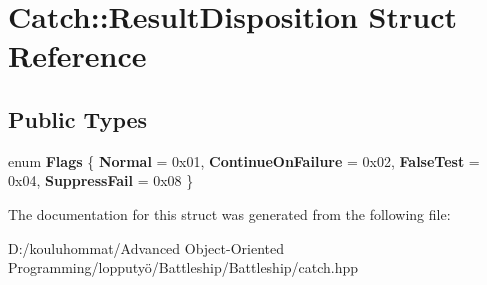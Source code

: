 \hypertarget{struct_catch_1_1_result_disposition}{}\section{Catch\+:\+:Result\+Disposition Struct Reference}
\label{struct_catch_1_1_result_disposition}
\subsection*{Public Types}
\begin{DoxyCompactItemize}
\item 
\mbox{\label{struct_catch_1_1_result_disposition_a3396cad6e2259af326b3aae93e23e9d8}} 
enum {\bfseries Flags} \{ {\bfseries Normal} = 0x01, 
{\bfseries Continue\+On\+Failure} = 0x02, 
{\bfseries False\+Test} = 0x04, 
{\bfseries Suppress\+Fail} = 0x08
 \}
\end{DoxyCompactItemize}


The documentation for this struct was generated from the following file\+:\begin{DoxyCompactItemize}
\item 
D\+:/kouluhommat/\+Advanced Object-\/\+Oriented Programming/lopputyö/\+Battleship/\+Battleship/catch.\+hpp\end{DoxyCompactItemize}
